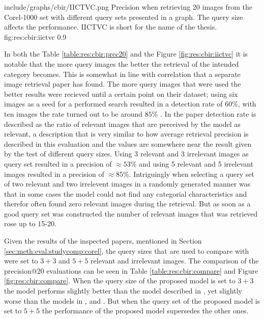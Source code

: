 \singlefigurenear
{include/graphs/cbir/IICTVC.png}
{Precision when retrieving 20 images from the Corel-1000 set with different query sets presented in a graph. The query size affects the performance. IICTVC is short for the name of the thesis.}
{fig:res:cbir:iictvc}
{0.9}

In both the Table \ref{table:res:cbir:prec20} and the Figure \ref{fig:res:cbir:iictvc} it is notable that the more query images the better the retrieval of the intended category becomes. This is somewhat in line with correlation that a separate image retrieval paper has found. The more query images that were used the better results were recieved until a certain point on their dataset; using six images as a seed for a performed search resulted in a detection rate of $60\%$, with ten images the rate turned out to be around $85\%$ \cite{li2010optimol}. In the paper detection rate is described as the ratio of relevant images that are perceived by the model as relevant, a description that is very similar to how average retrieval precision is described in this evaluation and the values are somewhere near the result given by the test of different query sizes. Using 3 relevant and 3 irrelevant images as query set resulted in a precision of $\approx53\%$ and using 5 relevant and 5 irrelevant images resulted in a precision of $\approx85\%$. Intriguingly when selecting a query set of two relevant and two irrelevent images in a randomly generated manner was that in some cases the model could not find any categorial characteristics and therefor often found zero relevant images during the retrieval. But as soon as a good query set was constructed the number of relevant images that was retrieved rose up to 15-20. 



Given the results of the inspected papers, mentioned in Section \ref{sec:meth:eval:studycomp:corel}, the query sizes that are used to compare with were set to $3+3$ and $5+5$ relevant and irrelevant images. The comparison of the precision@20 evaluations can be seen in Table \ref{table:res:cbir:compare} and Figure \ref{fig:res:cbir:compare}. When the query size of the proposed model is set to $3+3$ the model performs slightly better than the model described in \cite{wang2001simplicity}, yet slightly worse than the models in \cite{subrahmanyam2013modified}, \cite{nagaraja2015low} and \cite{elalami2014new}. But when the query set of the proposed model is set to $5+5$ the performance of the proposed model supersedes the other ones. 


